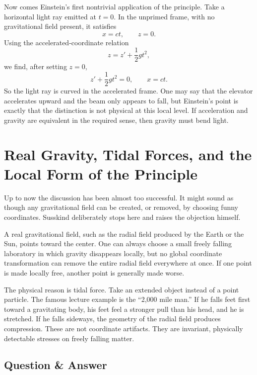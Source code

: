 Now comes Einstein's first nontrivial application of the principle.  Take a horizontal light ray emitted at \(t=0\).  In the unprimed frame, with no gravitational field present, it satisfies
\begin{equation}
x = ct,\qquad z=0.
\end{equation}
Using the accelerated-coordinate relation
\begin{equation}
z = z' + \frac{1}{2}gt^2,
\end{equation}
we find, after setting \(z=0\),
\begin{equation}
z' + \frac{1}{2}gt^2 = 0,\qquad x=ct.
\end{equation}
So the light ray is curved in the accelerated frame.  One may say that the elevator accelerates upward and the beam only appears to fall, but Einstein's point is exactly that the distinction is not physical at this local level.  If acceleration and gravity are equivalent in the required sense, then gravity must bend light.

\section{Real Gravity, Tidal Forces, and the Local Form of the Principle}

Up to now the discussion has been almost too successful.  It might sound as though any gravitational field can be created, or removed, by choosing funny coordinates.  Susskind deliberately stops here and raises the objection himself.

A real gravitational field, such as the radial field produced by the Earth or the Sun, points toward the center.  One can always choose a small freely falling laboratory in which gravity disappears locally, but no global coordinate transformation can remove the entire radial field everywhere at once.  If one point is made locally free, another point is generally made worse.

The physical reason is tidal force.  Take an extended object instead of a point particle.  The famous lecture example is the ``2,000 mile man.''  If he falls feet first toward a gravitating body, his feet feel a stronger pull than his head, and he is stretched.  If he falls sideways, the geometry of the radial field produces compression.  These are not coordinate artifacts.  They are invariant, physically detectable stresses on freely falling matter.

\subsection{Question \& Answer}

